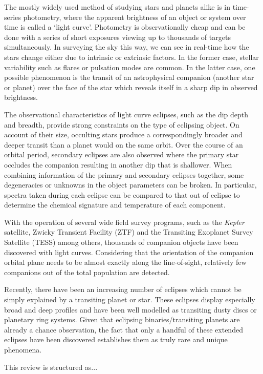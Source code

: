 \documentclass[%
 reprint,
 amsmath,amssymb,
 aps,
rmp,
floatfix,
]{revtex4-2}
\begin{document}
The mostly widely used method of studying stars and planets alike is in time-series photometry, where the apparent brightness of an object or system over time is called a `light curve'. Photometry is observationally cheap and can be done with a series of short exposures viewing up to thousands of targets simultaneously. In surveying the sky this way, we can see in real-time how the stars change either due to intrinsic or extrinsic factors. In the former case, stellar variability such as flares or pulsation modes are common. In the latter case, one possible phenomenon is the transit of an astrophysical companion (another star or planet) over the face of the star which reveals itself in a sharp dip in observed brightness. 

The observational characteristics of light curve eclipses, such as the dip depth and breadth, provide strong constraints on the type of eclipsing object. On account of their size, occulting stars produce a correspondingly broader and deeper transit than a planet would on the same orbit. Over the course of an orbital period, secondary eclipses are also observed where the primary star occludes the companion resulting in another dip that is shallower. When combining information of the primary and secondary eclipses together, some degeneracies or unknowns in the object parameters can be broken. In particular, spectra taken during each eclipse can be compared to that out of eclipse to determine the chemical signature and temperature of each component.

With the operation of several wide field survey programs, such as the \textit{Kepler} satellite, Zwicky Transient Facility (ZTF) and the Transiting Exoplanet Survey Satellite (TESS) among others, thousands of companion objects have been discovered with light curves. Considering that the orientation of the companion orbital plane needs to be almost exactly along the line-of-sight, relatively few companions out of the total population are detected. 

Recently, there have been an increasing number of eclipses which cannot be simply explained by a transiting planet or star. These eclipses display especially broad and deep profiles and have been well modelled as transiting dusty discs or planetary ring systems. Given that eclipsing binaries/transiting planets are already a chance observation, the fact that only a handful of these extended eclipses have been discovered establishes them as truly rare and unique phenomena.

This review is structured as...
\end{document}
